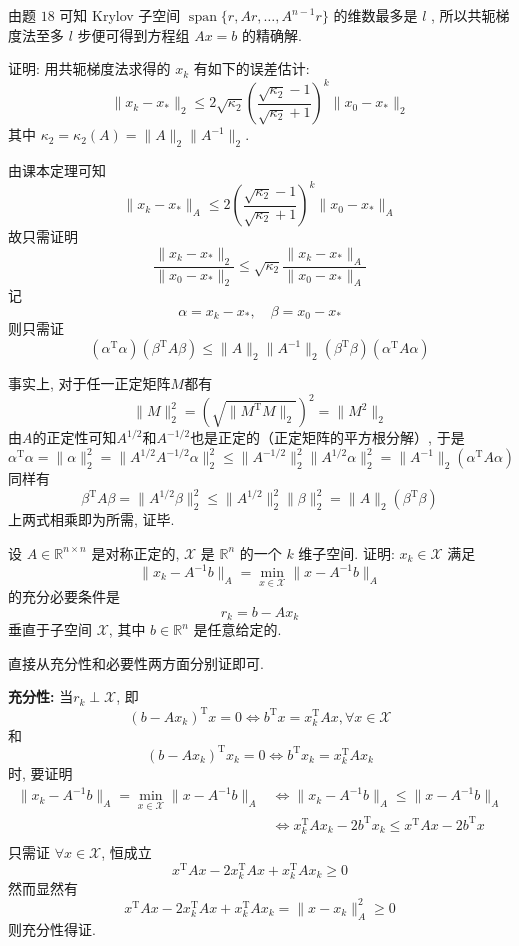 \documentclass[12pt, answers]{exam}     %
\newcommand{\R}{\mathbb{R}}
\newcommand{\T}{\mathrm{T}}
\begin{document}
\begin{questions}
\begin{solution}
由题 \( 18 \) 可知 Krylov 子空间 \( \operatorname{span}\{r, Ar, \ldots, A^{n-1}r \} \) 的维数最多是 \( l \) , 所以共轭梯度法至多 \( l \) 步便可得到方程组 \( Ax = b \) 的精确解. 
\end{solution}

\question{}
证明: 用共轭梯度法求得的 \( x_k \) 有如下的误差估计: 
\[
\|x_k - x_*\|_2 \leq 2\sqrt{\kappa_2} \left( \frac{\sqrt{\kappa_2} - 1}{\sqrt{\kappa_2} + 1} \right)^k \|x_0 - x_*\|_2
\]
其中 \(\kappa_2 = \kappa_2(A) = \|A\|_2 \|A^{-1}\|_2\). 

\begin{solution}
由课本定理可知
\[
\|x_k - x_*\|_A \leq 2 \left( \frac{\sqrt{\kappa_2} - 1}{\sqrt{\kappa_2} + 1} \right)^k \|x_0 - x_*\|_A
\]
故只需证明
\[
\frac{\|x_k - x_*\|_2}{\|x_0 - x_*\|_2} \leq \sqrt{\kappa_2} \frac{\|x_k - x_*\|_A}{\|x_0 - x_*\|_A}
\]
记
\[
\alpha = x_k - x_*, \quad \beta = x_0 - x_*
\]
则只需证
\[
(\alpha^{\T}\alpha)(\beta^{\T} A\beta) \leq \|A\|_2 \|A^{-1}\|_2 (\beta^{\T}\beta)(\alpha^{\T} A\alpha)
\]

事实上, 对于任一正定矩阵$M$都有
\[
\| M \|_2^2 = (\sqrt{\| M^{\T}M \|_2})^2 = \| M^2 \|_2
\]
由\(A\)的正定性可知$A^{1/2}$和$A^{-1/2}$也是正定的（正定矩阵的平方根分解）, 于是 
\[
\alpha^{\T}\alpha = \|\alpha\|_2^2
= \|A^{1/2}A^{-1/2}\alpha\|_2^2
\leq \|A^{-1/2}\|_2^2 \|A^{1/2}\alpha\|_2^2
= \|A^{-1}\|_2 (\alpha^{\T} A\alpha)
\]
同样有 
\[
\beta^{\T} A\beta = \|A^{1/2}\beta\|_2^2
\leq \|A^{1/2}\|_2^2 \|\beta\|_2^2
= \|A\|_2 (\beta^{\T}\beta)
\]
上两式相乘即为所需, 证毕. 
\end{solution}


\question{}设 \( A \in \R^{n \times n} \) 是对称正定的, \( \mathcal{X} \) 是 \( \R^n \) 的一个 \( k \) 维子空间. 证明:   
\( x_k \in \mathcal{X} \)  
满足  
\[ \| x_k - A^{-1} b \|_A = \min_{x \in \mathcal{X}} \| x - A^{-1} b \|_A \]  
的充分必要条件是  
\[ r_k = b - A x_k \]  
垂直于子空间 \( \mathcal{X} \), 其中 \( b \in \R^n \) 是任意给定的. 

\begin{solution}
直接从充分性和必要性两方面分别证即可. 

\textbf{充分性:}
当\( r_k \perp \mathcal{X} \), 即
\[
(b - A x_k)^{\T} x = 0 \Leftrightarrow b^{\T}x = x_k^{\T} A x, \forall x \in \mathcal{X}
\]
和
\[
(b - A x_k)^{\T} x_k = 0 \Leftrightarrow b^{\T}x_k = x_k^{\T} A x_k
\]
时, 要证明
\begin{align*}
\| x_k - A^{-1} b \|_A = \min_{x \in \mathcal{X}} \| x - A^{-1} b \|_A &\Leftrightarrow \| x_k - A^{-1} b \|_A \leq \| x - A^{-1} b \|_A   \\
&\Leftrightarrow x_k^{\T} A x_k - 2 b^{\T} x_k \leq x^{\T} A x - 2 b^{\T} x \\
\end{align*}
只需证 \( \forall x \in \mathcal{X} \), 恒成立
\[
x^{\T} A x - 2 x_k^{\T} A x + x_k^{\T} A x_k \geq 0
\]
然而显然有
\[
x^{\T} A x - 2 x_k^{\T} A x + x_k^{\T} A x_k = \|x - x_k\|_{A}^2 \geq 0
\]
则充分性得证. 


\end{solution}
\end{questions}
\end{document}
